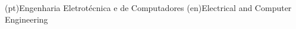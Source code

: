 













\ntdegreename(pt){Engenharia Eletrotécnica e de Computadores}
\ntdegreename(en){Electrical and Computer Engineering}






